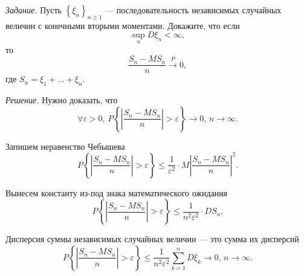 \textit{Задание.}
Пусть $ \left\{ \xi_n \right\}_{n \geq 1}$ ---
последовательность независимых случайных величин с конечными вторыми моментами.
Докажите, что если
$$ \sup \limits_n D \xi_n <
  \infty,$$
то
$$ \frac{S_n - MS_n}{n} \overset{P}{ \rightarrow } 0,$$
где $S_n = \xi_1 + \dotsc + \xi_n$.

\textit{Решение.} Нужно доказать, что
$$ \forall \varepsilon > 0, \,
  P \left\{ \left| \frac{S_n - MS_n}{n} \right| > \varepsilon \right\} \to 0, \,
  n \to \infty.$$

Запишем неравенство Чебышева
$$P \left\{ \left| \frac{S_n - MS_n}{n} \right| > \varepsilon \right\} \leq
  \frac{1}{ \varepsilon^2} \cdot M \left| \frac{S_n - MS_n}{n} \right|^2.$$

Вынесем константу из-под знака математического ожидания
$$P \left\{ \left| \frac{S_n - MS_n}{n} \right| > \varepsilon \right\} \leq
  \frac{1}{n^2 \varepsilon^2} \cdot DS_n.$$

Дисперсия суммы независимых случайных величин --- это сумма их дисперсий
$$P \left\{ \left| \frac{S_n - MS_n}{n} \right| > \varepsilon \right\} \leq
  \frac{1}{n^2 \varepsilon^2} \sum \limits_{k = 1}^n D \xi_k \to
  0, \,
  n \to \infty.$$
